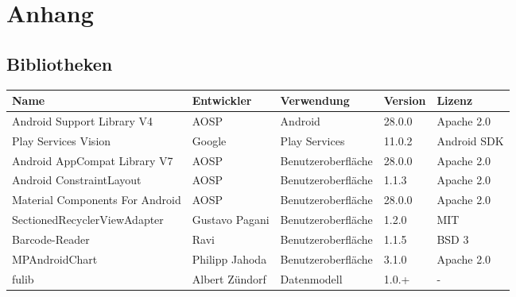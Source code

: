 \section{Anhang}\label{sec:bib}

\subsection{Bibliotheken}\label{subsec:bibliotheken}

\begin{table}[h]
    \renewcommand{\arraystretch}{1.1}

    \begin{tabularx}{\textwidth}{|X|l|l|l|l|}
        \hline
        \textbf{Name} & \textbf{Entwickler} & \textbf{Verwendung} & \textbf{Version} & \textbf{Lizenz} \\
        [0.5ex] \hline
        Android Support Library V4 & AOSP & Android & 28.0.0 & Apache 2.0\\   %
        \hline

        Play Services Vision & Google & Play Services & 11.0.2 & Android SDK\\  %
        \hline

        Android AppCompat Library V7 & AOSP & Benutzeroberfläche & 28.0.0 & Apache 2.0\\    %
        Android ConstraintLayout & AOSP & Benutzeroberfläche & 1.1.3 & Apache 2.0\\   %
        Material Components For Android & AOSP & Benutzeroberfläche & 28.0.0 & Apache 2.0\\  %
        SectionedRecyclerViewAdapter & Gustavo Pagani & Benutzeroberfläche & 1.2.0 & MIT\\   %
        Barcode-Reader & Ravi & Benutzeroberfläche & 1.1.5 & BSD 3\\   %
        MPAndroidChart & Philipp Jahoda & Benutzeroberfläche & 3.1.0 & Apache 2.0\\  %
        \hline

        fulib & Albert Zündorf & Datenmodell & 1.0.+ & -\\    %
        \hline


\end{tabularx}
\end{table}
